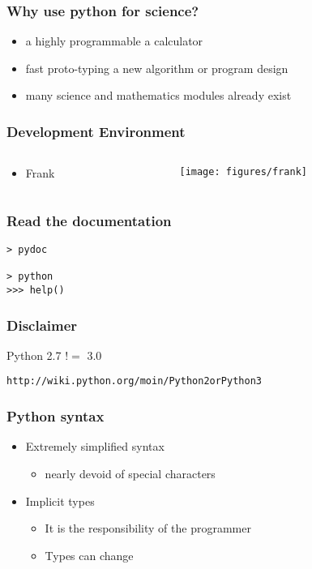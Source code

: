 \documentclass[xcolor=table,10pt,final]{beamer}
\begin{document}
\begin{frame}[fragile]
  \frametitle{Why use python for science?}
  \begin{itemize}
    \item a highly programmable a calculator
    \item fast proto-typing a new algorithm or program design
    \item many science and mathematics modules already exist
  \end{itemize}
\end{frame}

\begin{frame}
  \frametitle{Development Environment}
  \begin{columns}
    \begin{column}{0.5\paperwidth}
      \begin{itemize}
        \item Frank
      \end{itemize}
    \end{column}
    \begin{column}{0.5\paperwidth}
      \centering
      \texttt{[image: figures/frank]}
    \end{column}
  \end{columns}
\end{frame}

\begin{frame}[fragile]
  \frametitle{Read the documentation}
  \begin{verbatim}
> pydoc

> python
>>> help()
\end{verbatim}
\end{frame}




\begin{frame}[fragile]
  \frametitle{Disclaimer}
  Python 2.7 $!=$ 3.0
  \vskip1cm
  \begin{verbatim}
http://wiki.python.org/moin/Python2orPython3
\end{verbatim}
\end{frame}

\begin{frame}
  \frametitle{Python syntax}
  \begin{itemize}
    \item Extremely simplified syntax
      \begin{itemize}
        \item nearly devoid of special characters
      \end{itemize}
    \item Implicit types
      \begin{itemize}
        \item It is the responsibility of the programmer
        \item Types can change
      \end{itemize}
  \end{itemize}
\end{frame}
\end{document}
